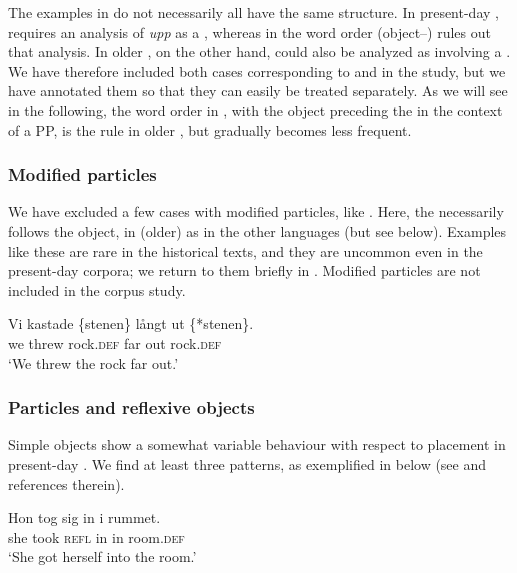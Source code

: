 \documentclass[output=paper]{langscibook}
\begin{document}
The examples in  do not necessarily all have the same structure. In present-day ,  requires an analysis of \textit{upp} as a , whereas in  the word order (object–) rules out that analysis. In older , on the other hand,  could also be analyzed as involving a . We have therefore included both cases corresponding to  and  in the study, but we have annotated them so that they can easily be treated separately. As we will see in the following, the word order in , with the object preceding the  in the context of a PP, is the rule in older , but gradually becomes less frequent.



\subsubsection{Modified particles} 
We have excluded a few cases with modified particles, like . Here, the  necessarily follows the object, in (older)  as in the other  languages (but see  below). Examples like these are rare in the historical texts, and they are uncommon even in the present-day corpora; we return to them briefly in . Modified particles are not included in the corpus study.


\ea\label{ex:lalu:18}
\gll Vi    kastade   \{stenen\}     långt  ut \{*stenen\}.\\
we    threw       rock\textsc{.def}   far   out     rock\textsc{.def}    \\
\glt `We threw the rock far out.'
\z


\subsubsection{Particles and reflexive objects} 
Simple  objects show a somewhat variable behaviour with respect to  placement in present-day . We find at least three patterns, as exemplified in  below (see \citealt{Lundquist2014Reflexive} and references therein).


\ea\label{ex:lalu:19}
\ea\label{ex:lalu:19a}
\gll  Hon   tog     sig     in   i     rummet.\\
    she       took   \textsc{refl}   in   in     room\textsc{.def}\\
\glt `She got herself into the room.’\\
\end{document}
